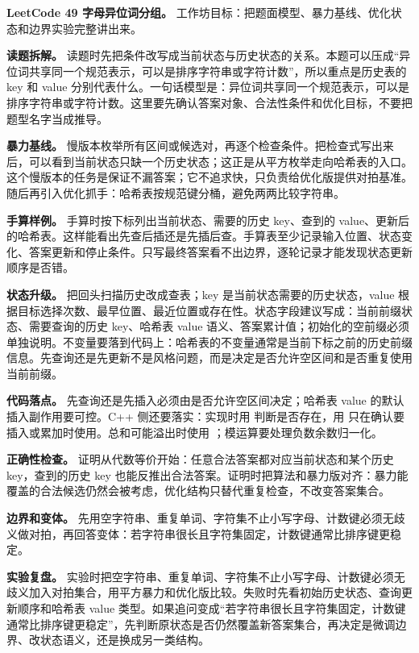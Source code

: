 \noindent\textbf{LeetCode 49 字母异位词分组。} 工作坊目标：把题面模型、暴力基线、优化状态和边界实验完整讲出来。

\textbf{读题拆解。} 读题时先把条件改写成当前状态与历史状态的关系。本题可以压成“异位词共享同一个规范表示，可以是排序字符串或字符计数”，所以重点是历史表的 key 和 value 分别代表什么。一句话模型是：异位词共享同一个规范表示，可以是排序字符串或字符计数。这里要先确认答案对象、合法性条件和优化目标，不要把题型名字当成推导。

\textbf{暴力基线。} 慢版本枚举所有区间或候选对，再逐个检查条件。把检查式写出来后，可以看到当前状态只缺一个历史状态；这正是从平方枚举走向哈希表的入口。这个慢版本的任务是保证不漏答案；它不追求快，只负责给优化版提供对拍基准。随后再引入优化抓手：哈希表按规范键分桶，避免两两比较字符串。

\textbf{手算样例。} 手算时按下标列出当前状态、需要的历史 key、查到的 value、更新后的哈希表。这样能看出先查后插还是先插后查。手算表至少记录输入位置、状态变化、答案更新和停止条件。只写最终答案看不出边界，逐轮记录才能发现状态更新顺序是否错。

\textbf{状态升级。} 把回头扫描历史改成查表；key 是当前状态需要的历史状态，value 根据目标选择次数、最早位置、最近位置或存在性。状态字段建议写成：当前前缀状态、需要查询的历史 key、哈希表 value 语义、答案累计值；初始化的空前缀必须单独说明。不变量要落到代码上：哈希表的不变量通常是当前下标之前的历史前缀信息。先查询还是先更新不是风格问题，而是决定是否允许空区间和是否重复使用当前前缀。

\textbf{代码落点。} 先查询还是先插入必须由是否允许空区间决定；哈希表 value 的默认插入副作用要可控。C++ 侧还要落实：实现时用  判断是否存在，用  只在确认要插入或累加时使用。总和可能溢出时使用 ；模运算要处理负数余数归一化。

\textbf{正确性检查。} 证明从代数等价开始：任意合法答案都对应当前状态和某个历史 key，查到的历史 key 也能反推出合法答案。证明时把算法和暴力版对齐：暴力能覆盖的合法候选仍然会被考虑，优化结构只替代重复检查，不改变答案集合。

\textbf{边界和变体。} 先用空字符串、重复单词、字符集不止小写字母、计数键必须无歧义做对拍，再回答变体：若字符串很长且字符集固定，计数键通常比排序键更稳定。

\textbf{实验复盘。} 实验时把空字符串、重复单词、字符集不止小写字母、计数键必须无歧义加入对拍集合，用平方暴力和优化版比较。失败时先看初始历史状态、查询更新顺序和哈希表 value 类型。如果追问变成“若字符串很长且字符集固定，计数键通常比排序键更稳定”，先判断原状态是否仍然覆盖新答案集合，再决定是微调边界、改状态语义，还是换成另一类结构。

